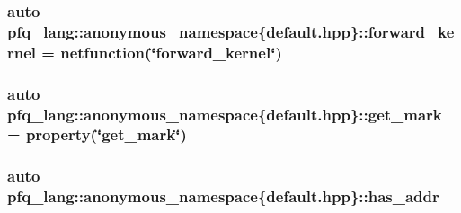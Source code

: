 \hypertarget{namespacepfq__lang_1_1anonymous__namespace_02default_8hpp_03_a453450a8ebf5660ab590a3ffb79057e1}{
\subsubsection[{forward\+\_\+kernel}]{\setlength{\rightskip}{0pt plus 5cm}auto pfq\+\_\+lang\+::anonymous\+\_\+namespace\{default.\+hpp\}\+::forward\+\_\+kernel = {\bf netfunction}(\char`\"{}forward\+\_\+kernel\char`\"{})}}\label{namespacepfq__lang_1_1anonymous__namespace_02default_8hpp_03_a453450a8ebf5660ab590a3ffb79057e1}
\hypertarget{namespacepfq__lang_1_1anonymous__namespace_02default_8hpp_03_a85f5de783fc38d6c0539f1f4afac189b}{
\subsubsection[{get\+\_\+mark}]{\setlength{\rightskip}{0pt plus 5cm}auto pfq\+\_\+lang\+::anonymous\+\_\+namespace\{default.\+hpp\}\+::get\+\_\+mark = {\bf property}(\char`\"{}get\+\_\+mark\char`\"{})}}\label{namespacepfq__lang_1_1anonymous__namespace_02default_8hpp_03_a85f5de783fc38d6c0539f1f4afac189b}
\hypertarget{namespacepfq__lang_1_1anonymous__namespace_02default_8hpp_03_ac3ef3eefe441b183db012637b4459836}{
\subsubsection[{has\+\_\+addr}]{\setlength{\rightskip}{0pt plus 5cm}auto pfq\+\_\+lang\+::anonymous\+\_\+namespace\{default.\+hpp\}\+::has\+\_\+addr}}\label{namespacepfq__lang_1_1anonymous__namespace_02default_8hpp_03_ac3ef3eefe441b183db012637b4459836}
